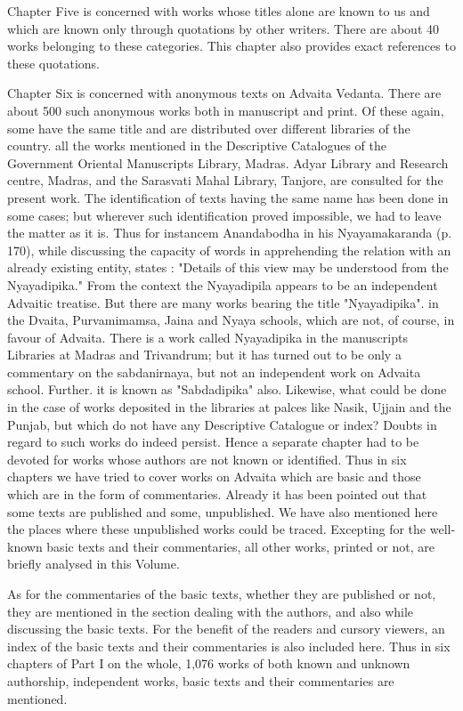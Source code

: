 Chapter Five is concerned with works whose titles alone are known to us and which are known only through quotations by other writers. There are about 40 works belonging to these categories. This chapter also provides exact references to these quotations. 

Chapter Six is concerned with anonymous texts on Advaita Vedanta. There are about 500 such anonymous works both in manuscript and print. Of these again, some have the same title and are distributed over different libraries of the country. all the works mentioned in the Descriptive Catalogues of the Government Oriental Manuscripts Library, Madras. Adyar Library and Research centre, Madras, and the Sarasvati Mahal Library, Tanjore, are consulted for the present work. The identification of texts having the same name has been done in some cases; but wherever such identification proved impossible, we had to leave the matter as it is. Thus for instancem Anandabodha in his Nyayamakaranda (p. 170), while discussing the capacity of words in apprehending the relation with an already existing entity, states : "Details of this view may be understood from the Nyayadipika." From the context the Nyayadipila appears to be an independent Advaitic treatise. But there are many works bearing the title "Nyayadipika". in the Dvaita, Purvamimamsa, Jaina and Nyaya schools, which are not, of course, in favour of Advaita. There is a work called Nyayadipika in the manuscripts Libraries at Madras and Trivandrum; but it has turned out to be only a commentary on the sabdanirnaya, but not an independent work on Advaita school. Further. it is known as "Sabdadipika" also. Likewise, what could be done in the case of works deposited in the libraries at palces like Nasik, Ujjain and the Punjab, but which do not have any Descriptive Catalogue or index? Doubts in regard to such works do indeed persist. Hence a separate chapter had to be devoted for works whose authors are not known or identified. Thus in six chapters we have tried to cover works on Advaita which are basic and those which are in the form of commentaries. Already it has been pointed out that some texts are published and some, unpublished. We have also mentioned here the places where these unpublished works could be traced. Excepting for the well-known basic texts and their commentaries, all other works, printed or not, are briefly analysed in this Volume. 

As for the commentaries of the basic texts, whether they are published or not, they are mentioned in the section dealing with the authors, and also while discussing the basic texts. For the benefit of the readers and cursory viewers, an index of the basic texts and their commentaries is also included here. Thus in six chapters of Part I on the whole, 1,076 works of both known and unknown authorship, independent works, basic texts and their commentaries are mentioned. 

